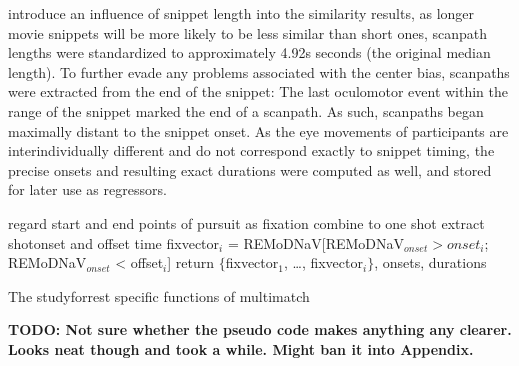 \documentclass[a4paper, 12pt]{scrreprt}
\begin{document}
{introduce an influence of snippet length into the similarity results, as longer movie snippets will be more likely to be less similar than short ones, scanpath lengths were standardized to approximately 4.92s seconds (the original median length). To further evade any problems associated with the center bias, scanpaths were extracted from the end of the snippet: The last oculomotor event within the range of the snippet marked the end of a scanpath. As such, scanpaths began maximally distant to the snippet onset.
As the eye movements of participants are interindividually different and do not correspond exactly to snippet timing, the precise onsets and resulting exact durations were computed as well, and stored for later use as regressors.

\begin{algorithm}[H]
	\begin{small}
	
	{
		{
			regard start and end points of pursuit as fixation
		}
	}
	{
	}
	{
		{combine to one shot}
	}
	{
		{extract shotonset and offset time}
	}
	{fixvector$_i$ = REMoDNaV[REMoDNaV$_{onset} > onset_i$; REMoDNaV$_{onset}$ < offset$_i$]
	}
	return $\{$fixvector$_1$, \ldots, fixvector$_i$$\}$, onsets, durations
	\caption{The studyforrest specific functions of multimatch}
	\label{algo:multimatch_forrest}
	\end{small}
\end{algorithm}
\textbf{TODO: Not sure whether the pseudo code makes anything any clearer. Looks neat though and took a while. Might ban it into Appendix.}

}
\end{document}
